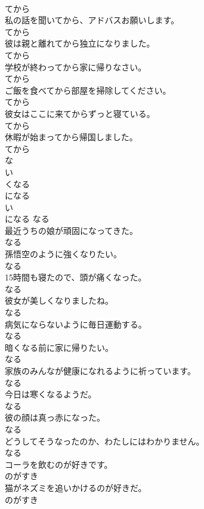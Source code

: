 \documentclass[8pt]{extreport}
\begin{document}
\begin{CJK}{UTF8}{min}
\\	てから
\\	私の話を聞いてから、アドバスお願いします。	
\\	てから
\\	彼は親と離れてから独立になりました。	
\\	てから
\\	学校が終わってから家に帰りなさい。	
\\	てから
\\	ご飯を食べてから部屋を掃除してください。	
\\	てから
\\	彼女はここに来てからずっと寝ている。	
\\	てから
\\	休暇が始まってから帰国しました。	
\\	てから
\\	な
\\	い 
\\	くなる	
\\	になる	
\\	い
\\	になる	なる
\\	最近うちの娘が頑固になってきた。	
\\	なる
\\	孫悟空のように強くなりたい。	
\\	なる
\\	15時間も寝たので、頭が痛くなった。	
\\	なる
\\	彼女が美しくなりましたね。	
\\	なる
\\	病気にならないように毎日運動する。	
\\	なる
\\	暗くなる前に家に帰りたい。	
\\	なる
\\	家族のみんなが健康になれるように祈っています。	
\\	なる
\\	今日は寒くなるようだ。	
\\	なる
\\	彼の顔は真っ赤になった。	
\\	なる
\\	どうしてそうなったのか、わたしにはわかりません。	
\\	なる
\\	コーラを飲むのが好きです。	
\\	のがすき
\\	猫がネズミを追いかけるのが好きだ。	
\\	のがすき

\end{CJK}
\end{document}

